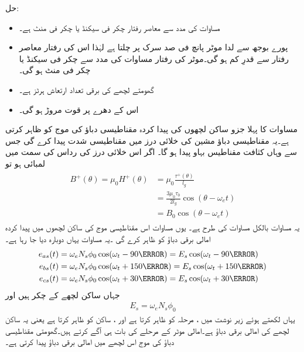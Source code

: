 حل:
\begin{itemize}
\item
مساوات   کی مدد سے معاصر رفتار  چکر فی سیکنڈ یا  چکر فی منٹ ہے۔
\item
پورے بوجھ سے لدا موٹر پانچ فی صد سرک پر چلتا ہے لہٰذا اس کی رفتار معاصر رفتار سے قدرِ کم ہو گی۔موٹر کی رفتار مساوات    کی مدد سے  چکر فی سیکنڈ یا  چکر فی منٹ ہو گی۔
\item
گھومتے لچھے کی برقی تعداد ارتعاش  ہرٹز ہے۔
\item
اس کے دھرے پر قوت مروڑ  ہو گی۔
\end{itemize}
%
مساوات   کا پہلا جزو ساکن لچھوں کی پیدا کردہ مقناطیسی دباؤ کی موج  کو ظاہر کرتی ہے۔یہ مقناطیسی دباؤ مشین کی خلائی درز میں مقناطیسی شدت  پیدا کرے گی جس سے وہاں کثافت مقناطیس بہاو  پیدا ہو گا۔ اگر اس خلائی درز کی رداس کی سمت میں لمبائی  ہو تو
\begin{gather}
\begin{aligned}
B^+(\theta)=\mu_0 H^+(\theta)&=\mu_0 \frac{\tau^+(\theta)}{l_g}\\
&=\frac{3 \mu_0 \tau_0}{2 l_g} \cos (\theta-\omega_e t)\\
&=B_0 \cos (\theta-\omega_e t)
\end{aligned}
\end{gather}
یہ مساوات بالکل مساوات   کی طرح ہے۔ یوں مساوات    اس مقناطیسی موج  کی ساکن لچھوں میں پیدا کردہ امالی برقی دباؤ کو ظاہر کرے گی ۔یہ مساوات یہاں دوبارہ دیا جا رہا ہے۔
\begin{gather}
\begin{aligned}\label{مساوات_امالی_تین_دور_سائن_نما_برقی_دباؤ}
e_{as}(t)&=\omega_e N_s \phi_0 \cos (\omega_t -90\degree)=E_s \cos (\omega_t -90\degree)\\
e_{bs}(t)&=\omega_e N_s \phi_0 \cos (\omega_t +150\degree)=E_s \cos (\omega_t +150\degree)\\
e_{cs}(t)&=\omega_e N_s \phi_0 \cos (\omega_t +30\degree)=E_s \cos (\omega_t +30\degree)
\end{aligned}
\end{gather}
جہاں  ساکن لچھے کے چکر ہیں اور
\begin{align}
E_s=\omega_e N_s \phi_0
\end{align}
یہاں   لکھتے ہوئے  زیر نوشت  میں  ، مرحلہ  کو ظاہر کرتا ہے اور ، ساکن کو ظاہر کرتا ہے یعنی یہ ساکن   لچھے کی امالی برقی دباؤ ہے۔امالی موٹر کے   مرحلے  کی بات ہی آگے کرتے ہیں۔گھومتی مقناطیسی دباؤ کی موج اس  لچھے میں امالی برقی دباؤ  پیدا کرتی ہے۔

